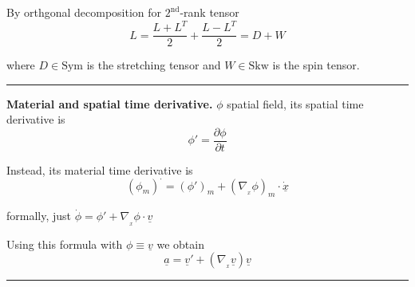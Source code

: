 \smallskip

By orthgonal decomposition for $2^{\text{nd}}$-rank tensor
\begin{equation*}
L=\frac{L+L^T}{2} +\frac{L-L^T}{2} =D+W
\end{equation*}

where $D\in\text{Sym}$ is the stretching tensor and $W\in\text{Skw}$ is the spin tensor.

\vspace{-0.5em}

\rule{0.31\textwidth}{0.2pt}
\smallskip

\textbf{Material and spatial time derivative.} $\phi$ spatial field, its spatial time derivative is
\begin{equation*}
\phi'=\frac{\partial \phi}{\partial t}
\end{equation*}

Instead, its material time derivative is 
\begin{equation*}
\left(\phi_m\right)^\cdot=\left(\phi'\right)_m+\left( \nabla_{\!\!_x} \phi \right)_m \cdot \dot{\underline{x}}
\end{equation*}

formally, just $\boxed{\dot{\phi}=\phi'+\nabla_{\!\!_x} \phi \cdot \underline{v}}$

\smallskip

Using this formula with $\phi\equiv \underline{v}$ we obtain
\begin{equation*}
\boxed{\underline{a}=\underline{v}'+ \left(\nabla_{\!\!_x}\underline{v} \right) \underline{v}}
\end{equation*}

\rule{0.31\textwidth}{1pt}











